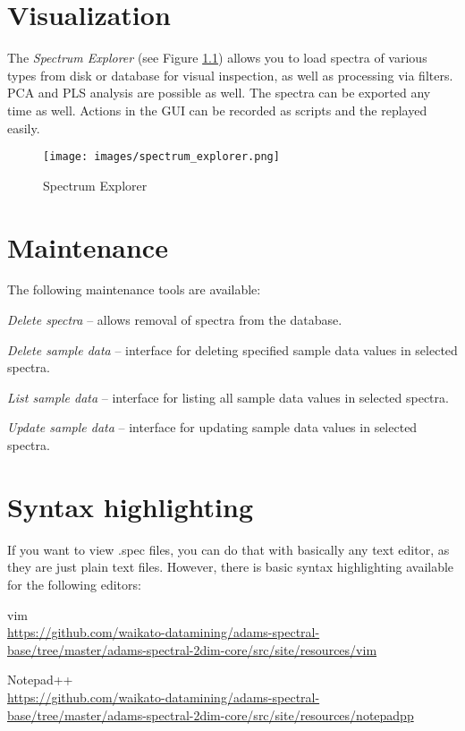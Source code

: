 \documentclass[a4paper]{book}
\begin{document}
\chapter{Visualization}
The \textit{Spectrum Explorer} (see Figure \ref{spectrum_explorer}) allows you
to load spectra of various types from disk or database for visual inspection,
as well as processing via filters. PCA and PLS analysis are possible as well.
The spectra can be exported any time as well.
Actions in the GUI can be recorded as scripts and the replayed easily.

\begin{figure}[htb]
  \centering
  \texttt{[image: images/spectrum\_explorer.png]}
  \caption{Spectrum Explorer}
  \label{spectrum_explorer}
\end{figure}

\chapter{Maintenance}
The following maintenance tools are available:
\begin{tight_itemize}
  \item \textit{Delete spectra} -- allows removal of spectra from the database.
  \item \textit{Delete sample data} -- interface for deleting specified sample data values
  in selected spectra.
  \item \textit{List sample data} -- interface for listing all sample data values
  in selected spectra.
  \item \textit{Update sample data} -- interface for updating sample data values
  in selected spectra.
\end{tight_itemize}

\chapter{Syntax highlighting}
If you want to view .spec files, you can do that with basically any text editor, as they are just
plain text files. However, there is basic syntax highlighting available for the following editors:
\begin{tight_itemize}
    \item vim \\
    \url{https://github.com/waikato-datamining/adams-spectral-base/tree/master/adams-spectral-2dim-core/src/site/resources/vim}{}
    \item Notepad++ \\
    \url{https://github.com/waikato-datamining/adams-spectral-base/tree/master/adams-spectral-2dim-core/src/site/resources/notepadpp}{}
\end{tight_itemize}


\end{document}
